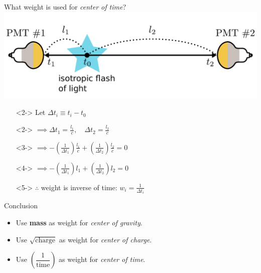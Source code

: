 \documentclass[14pt]{beamer}
\begin{document}
\begin{frame}{What weight is used for \emph{\color{blue}center of time}?}
	\includegraphics[width=\linewidth]{simple_example_of_center_of_time.pdf}
	\begin{itemize}
		\item[]<2-> Let $\Delta t_i \equiv t_i - t_0$
		\item[]<2-> $\implies \Delta t_1 = \frac{l_1}{c},\quad\Delta t_2 =
			\frac{l_2}{c}$
		\item[]<3-> $\implies -(\frac{1}{\Delta t_1})\frac{l_1}{c} +
			(\frac{1}{\Delta t_2})\frac{l_2}{c} = 0$
		\item[]<4-> $\implies -(\frac{1}{\Delta t_1})l_1 +
			(\frac{1}{\Delta t_2})l_2 = 0$
		\item[]<5-> $\therefore$ weight is inverse of time: $w_{i} =
			\frac{1}{\Delta t_{i}}$
	\end{itemize}
\end{frame}

\begin{frame}{Conclusion}
	\begin{itemize}
		\item<1-> Use \textbf{mass} as weight for \emph{center of gravity}.
		\item<2-> Use \textbf{$\sqrt{\text{charge}}$} as weight for
			\emph{\color{magenta}center of charge}.
		\item<3-> Use \textbf{$\left(\dfrac{1}{\text{time}}\right)$} as weight
			for \emph{\color{blue}center of time}.
	\end{itemize}
\end{frame}
\end{document}
